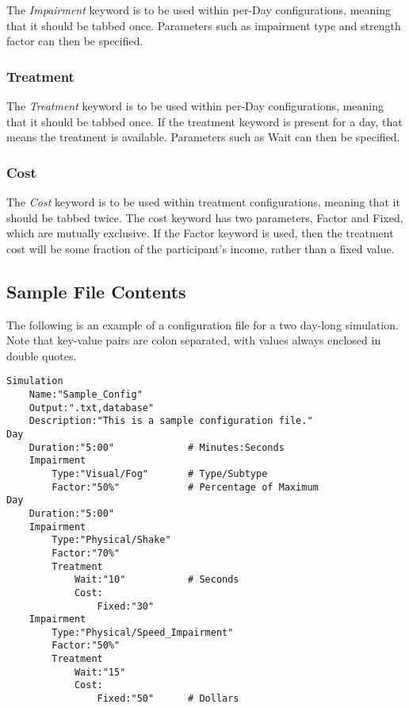 \documentclass{article}
\begin{document}
The \textit{Impairment} keyword is to be used within per-Day configurations, meaning that it should be tabbed once. Parameters such as impairment type and strength factor can then be specified. 

\subsubsection*{Treatment}

The \textit{Treatment} keyword is to be used within per-Day configurations, meaning that it should be tabbed once. If the treatment keyword is present for a day, that means the treatment is available. Parameters such as Wait can then be specified.

\subsubsection*{Cost}

The \textit{Cost} keyword is to be used within treatment configurations, meaning that it should be tabbed twice. The cost keyword has two parameters, Factor and Fixed, which are mutually exclusive. If the Factor keyword is used, then the treatment cost will be some fraction of the participant's income, rather than a fixed value.

\subsection*{Sample File Contents}
The following is an example of a configuration file for a two day-long simulation. Note that key-value pairs are colon separated, with values always enclosed in double quotes. 

\begin{lstlisting}
Simulation
    Name:"Sample_Config"
    Output:".txt,database"
    Description:"This is a sample configuration file."	
Day
    Duration:"5:00"             # Minutes:Seconds
    Impairment
        Type:"Visual/Fog"       # Type/Subtype
        Factor:"50%"            # Percentage of Maximum
Day
    Duration:"5:00"
    Impairment
        Type:"Physical/Shake"
        Factor:"70%"
        Treatment
            Wait:"10"           # Seconds
            Cost:
                Fixed:"30"
    Impairment
        Type:"Physical/Speed_Impairment"
        Factor:"50%"
        Treatment
            Wait:"15"
            Cost:
                Fixed:"50"      # Dollars
\end{lstlisting}


%



\end{document}
